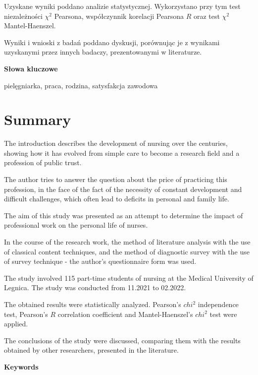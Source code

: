 \documentclass[a4paper,12pt,twoside,openright]{mwrep}
\begin{document}
Uzyskane wyniki poddano analizie statystycznej. Wykorzystano przy tym test niezależności $\chi^2$ Pearsona, współczynnik korelacji Pearsona $R$ oraz test $\chi^2$ Mantel-Haenszel.

Wyniki i wnioski z badań poddano dyskusji, porównując je z wynikami uzyskanymi przez innych badaczy, prezentowanymi w literaturze. 

\vspace{\baselineskip} 
\vspace{\baselineskip} 
\vspace{\baselineskip} 
\large
\textbf{Słowa kluczowe}
\normalsize
\vspace{\baselineskip} 

pielęgniarka, praca, rodzina, satysfakcja zawodowa

\chapter*{Summary}

The introduction describes the development of nursing over the centuries, showing how it has evolved from simple care to become a research field and a profession of public trust. 

The author tries to answer the question about the price of practicing this profession, in the face of the fact of the necessity of constant development and difficult challenges, which often lead to deficits in personal and family life. 

The aim of this study was presented as an attempt to determine the impact of professional work on the personal life of nurses.


In the course of the research work, the method of literature analysis with the use of classical content techniques, and the method of diagnostic survey with the use of survey technique - the author's questionnaire form was used. 

The study involved 115 part-time students of nursing at the Medical University of Legnica. The study was conducted from 11.2021 to 02.2022.

The obtained results were statistically analyzed. Pearson's $chi^2$ independence test, Pearson's $R$ correlation coefficient and Mantel-Haenszel's $chi^2$ test were applied.

The conclusions of the study were discussed, comparing them with the results obtained by other researchers, presented in the literature. 

\vspace{\baselineskip} 
\vspace{\baselineskip} 
\vspace{\baselineskip} 
\large
\textbf{Keywords}
\normalsize
\vspace{\baselineskip} 
\end{document}
